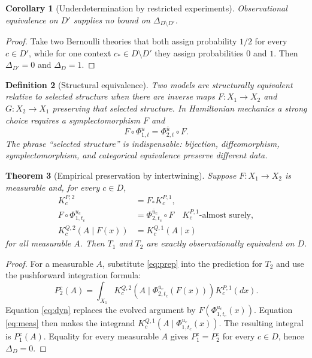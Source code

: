 \documentclass[11pt]{article}
\newtheorem{definition}{Definition}[section]
\newtheorem{theorem}[definition]{Theorem}
\newtheorem{corollary}[definition]{Corollary}
\begin{document}
\begin{corollary}[Underdetermination by restricted experiments]
Observational equivalence on $D'$ supplies no bound on $\Delta_{D\setminus D'}$.
\end{corollary}
\begin{proof}
Take two Bernoulli theories that both assign probability $1/2$ for every $c\in D'$, while for one context $c_*\in D\setminus D'$ they assign probabilities $0$ and $1$.  Then $\Delta_{D'}=0$ and $\Delta_D=1$.
\end{proof}

\begin{definition}[Structural equivalence]
Two models are structurally equivalent relative to selected structure when there are inverse maps $F:X_1\to X_2$ and $G:X_2\to X_1$ preserving that selected structure.  In Hamiltonian mechanics a strong choice requires a symplectomorphism $F$ and
\[
 F\circ\Phi_{1,t}^{u}=\Phi_{2,t}^{\bar u}\circ F.
\]
The phrase ``selected structure'' is indispensable: bijection, diffeomorphism, symplectomorphism, and categorical equivalence preserve different data.
\end{definition}

\begin{theorem}[Empirical preservation by intertwining]
Suppose $F:X_1\to X_2$ is measurable and, for every $c\in D$,
\begin{align}
 K^{P,2}_c&=F_*K^{P,1}_c,\label{eq:prep}\\
 F\circ\Phi^{u_c}_{1,t_c}&=\Phi^{\bar u_c}_{2,t_c}\circ F
 \quad K^{P,1}_c\text{-almost surely},\label{eq:dyn}\\
 K^{Q,2}_c(A\mid F(x))&=K^{Q,1}_c(A\mid x)\label{eq:meas}
\end{align}
for all measurable $A$.  Then $T_1$ and $T_2$ are exactly observationally equivalent on $D$.
\end{theorem}
\begin{proof}
For a measurable $A$, substitute \eqref{eq:prep} into the prediction for $T_2$ and use the pushforward integration formula:
\[
 P_2^c(A)=\int_{X_1}K^{Q,2}_c(A\mid\Phi_{2,t_c}^{\bar u_c}(F(x)))K^{P,1}_c(dx).
\]
Equation \eqref{eq:dyn} replaces the evolved argument by $F(\Phi_{1,t_c}^{u_c}(x))$.  Equation \eqref{eq:meas} then makes the integrand $K^{Q,1}_c(A\mid\Phi_{1,t_c}^{u_c}(x))$.  The resulting integral is $P_1^c(A)$.  Equality for every measurable $A$ gives $P_1^c=P_2^c$ for every $c\in D$, hence $\Delta_D=0$.
\end{proof}
\end{document}
